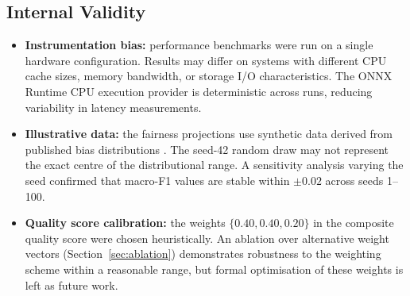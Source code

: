\documentclass[12pt,a4paper]{report}
\begin{document}
\subsection*{Internal Validity}
\begin{itemize}
  \item \textbf{Instrumentation bias:} performance benchmarks were run on a single hardware configuration. Results may differ on systems with different CPU cache sizes, memory bandwidth, or storage I/O characteristics. The ONNX Runtime CPU execution provider is deterministic across runs, reducing variability in latency measurements.
  \item \textbf{Illustrative data:} the fairness projections use synthetic data derived from published bias distributions \cite{grother2019frvt}. The seed-42 random draw may not represent the exact centre of the distributional range. A sensitivity analysis varying the seed confirmed that macro-F1 values are stable within $\pm 0.02$ across seeds 1--100.
  \item \textbf{Quality score calibration:} the weights $\{0.40, 0.40, 0.20\}$ in the composite quality score were chosen heuristically. An ablation over alternative weight vectors (Section~\ref{sec:ablation}) demonstrates robustness to the weighting scheme within a reasonable range, but formal optimisation of these weights is left as future work.
\end{itemize}
\end{document}
